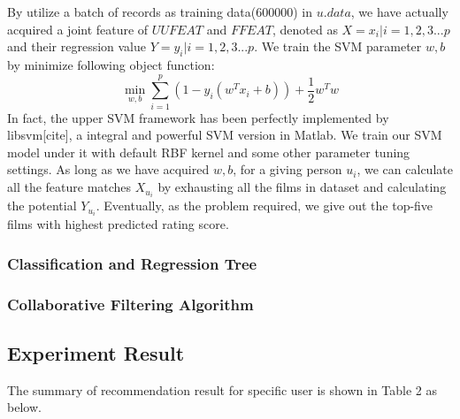 By utilize a batch of records as training data(600000) in $u.data$, we have actually acquired a joint feature of $UUFEAT$ and $FFEAT$, denoted as $\textit{X}={x_{i}|i=1,2,3...p}$ and their regression value $\textit{Y}={y_{i}|i=1,2,3...p}$. We train the SVM parameter $w,b$ by minimize following object function:
\begin{equation}
\min _{w,b}\sum ^{p}_{i=1}\left( 1-y_{i}\left( w^{T}x_{i}+b\right) \right) +\dfrac {1}{2}w^{T}w
\end{equation}
In fact, the upper SVM framework has been perfectly implemented by libsvm[cite], a integral and powerful SVM version in Matlab. We train our SVM model under it with default RBF kernel and some other parameter tuning settings. As long as we have acquired $w,b$, for a giving person $u_{i}$, we can calculate all the feature matches $X_{u_{i}}$ by exhausting all the films in dataset and calculating the potential $Y_{u_{i}}$. Eventually, as the problem required, we give out the top-five films with highest predicted rating score.

\subsubsection{Classification and Regression Tree}
\subsubsection{Collaborative Filtering Algorithm}

\subsection{Experiment Result}
The summary of recommendation result for specific user is shown in Table 2 as below.

